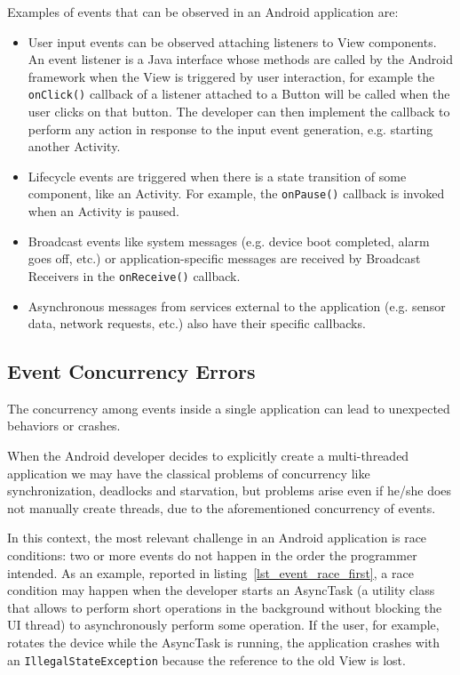\documentclass[11pt,a4paper,notitlepage]{article}
\begin{document}
Examples of events that can be observed in an Android application are:
\begin{itemize}
	\item User input events can be observed attaching listeners to View components. An event listener is a Java interface whose methods are called by the Android framework when the View is triggered by user interaction, for example the \texttt{onClick()} callback of a listener attached to a Button will be called when the user clicks on that button. The developer can then implement the callback to perform any action in response to the input event generation, e.g. starting another Activity.
	\item Lifecycle events are triggered when there is a state transition of some component, like an Activity. For example, the \texttt{onPause()} callback is invoked when an Activity is paused.
	\item Broadcast events like system messages (e.g. device boot completed, alarm goes off, etc.) or application-specific messages are received by Broadcast Receivers in the \texttt{onReceive()} callback.
	\item Asynchronous messages from services external to the application (e.g. sensor data, network requests, etc.) also have their specific callbacks.
\end{itemize}

\subsection{Event Concurrency Errors}
The concurrency among events inside a single application can lead to unexpected behaviors or crashes.

When the Android developer decides to explicitly create a multi-threaded application we may have the classical problems of concurrency like synchronization, deadlocks and starvation, but problems arise even if he/she does not manually create threads, due to the aforementioned concurrency of events.

In this context, the most relevant challenge in an Android application is race conditions: two or more events do not happen in the order the programmer intended. As an example, reported in listing~\ref{lst_event_race_first}, a race condition may happen when the developer starts an AsyncTask (a utility class that allows to perform short operations in the background without blocking the UI thread) to asynchronously perform some operation. If the user, for example, rotates the device while the AsyncTask is running, the application crashes with an \texttt{IllegalStateException} because the reference to the old View is lost.
\end{document}
